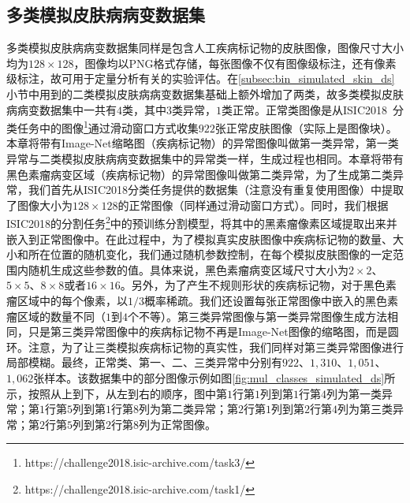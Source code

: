 \subsection{多类模拟皮肤病病变数据集}
多类模拟皮肤病病变数据集同样是包含人工疾病标记物的皮肤图像，图像尺寸大小均为$128\times 128$，图像均以PNG格式存储，每张图像不仅有图像级标注，还有像素级标注，故可用于定量分析有关的实验评估。在\ref{subsec:bin_simulated_skin_ds}小节中用到的二类模拟皮肤病病变数据集基础上额外增加了两类，故多类模拟皮肤病病变数据集中一共有$4$类，其中$3$类异常，$1$类正常。正常类图像是从ISIC2018~\cite{codella2019skin, tschandl2018ham10000}分类任务中的图像\footnote{https://challenge2018.isic-archive.com/task3/}通过滑动窗口方式收集$922$张正常皮肤图像（实际上是图像块）。本章将带有Image-Net缩略图（疾病标记物）的异常图像叫做第一类异常，第一类异常与二类模拟皮肤病病变数据集中的异常类一样，生成过程也相同。本章将带有黑色素瘤病变区域（疾病标记物）的异常图像叫做第二类异常，为了生成第二类异常，我们首先从ISIC2018分类任务提供的数据集（注意没有重复使用图像）中提取了图像大小为$128\times 128$的正常图像（同样通过滑动窗口方式）。同时，我们根据ISIC2018的分割任务\footnote{https://challenge2018.isic-archive.com/task1/}中的预训练分割模型，将其中的黑素瘤像素区域提取出来并嵌入到正常图像中。在此过程中，为了模拟真实皮肤图像中疾病标记物的数量、大小和所在位置的随机变化，我们通过随机参数控制，在每个模拟皮肤图像的一定范围内随机生成这些参数的值。具体来说，黑色素瘤病变区域尺寸大小为$2\times 2$、$5\times 5$、$8\times 8$或者$16\times 16$。另外，为了产生不规则形状的疾病标记物，对于黑色素瘤区域中的每个像素，以$1/3$概率稀疏。我们还设置每张正常图像中嵌入的黑色素瘤区域的数量不同（$1$到$4$个不等）。第三类异常图像与第一类异常图像生成方法相同，只是第三类异常图像中的疾病标记物不再是Image-Net图像的缩略图，而是圆环。注意，为了让三类模拟疾病标记物的真实性，我们同样对第三类异常图像进行局部模糊。最终，正常类、第一、二、三类异常中分别有$922$、$1,310$、$1,051$、$1,062$张样本。该数据集中的部分图像示例如图\ref{fig:mul_classes_simulated_ds}所示，按照从上到下，从左到右的顺序，图中第$1$行第$1$列到第$1$行第$4$列为第一类异常；第$1$行第$5$列到第$1$行第$8$列为第二类异常；第$2$行第$1$列到第$2$行第$4$列为第三类异常；第$2$行第$5$列到第$2$行第$8$列为正常图像。
